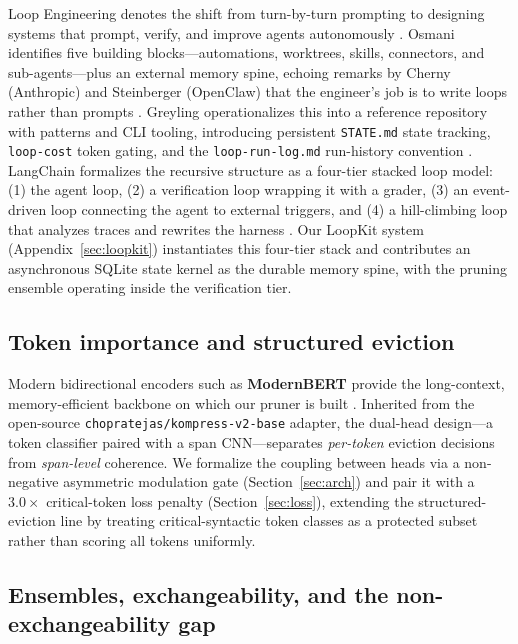 Loop Engineering denotes the shift from turn-by-turn prompting to designing
systems that prompt, verify, and improve agents autonomously
\citep{osmani2026loop}. Osmani identifies five building blocks---automations,
worktrees, skills, connectors, and sub-agents---plus an external memory spine,
echoing remarks by Cherny (Anthropic) and Steinberger (OpenClaw) that the
engineer's job is to write loops rather than prompts
\citep{osmani2026oreilly}. Greyling operationalizes this into a reference
repository with patterns and CLI tooling, introducing persistent
\texttt{STATE.md} state tracking, \texttt{loop-cost} token gating, and the
\texttt{loop-run-log.md} run-history convention \citep{greyling2026loop}.
LangChain formalizes the recursive structure as a four-tier stacked loop
model: (1) the agent loop, (2) a verification loop wrapping it with a grader,
(3) an event-driven loop connecting the agent to external triggers, and (4) a
hill-climbing loop that analyzes traces and rewrites the harness
\citep{langchain2026loops,langchain2026harness}. Our LoopKit system
(Appendix~\ref{sec:loopkit}) instantiates this four-tier stack and contributes
an asynchronous SQLite state kernel as the durable memory spine, with the
pruning ensemble operating inside the verification tier.

\subsection{Token importance and structured eviction}
\label{sec:rw:importance}

Modern bidirectional encoders such as \textbf{ModernBERT} provide the
long-context, memory-efficient backbone on which our pruner is built
\citep{warner2024modernbert}. Inherited from the open-source
\texttt{chopratejas/kompress-v2-base} adapter, the dual-head design---a token
classifier paired with a span CNN---separates \emph{per-token} eviction
decisions from \emph{span-level} coherence. We formalize the coupling between
heads via a non-negative asymmetric modulation gate (Section~\ref{sec:arch})
and pair it with a $3.0\times$ critical-token loss penalty (Section~\ref{sec:loss}),
extending the structured-eviction line by treating critical-syntactic token
classes as a protected subset rather than scoring all tokens uniformly.

\subsection{Ensembles, exchangeability, and the non-exchangeability gap}
\label{sec:rw:ensembles}

